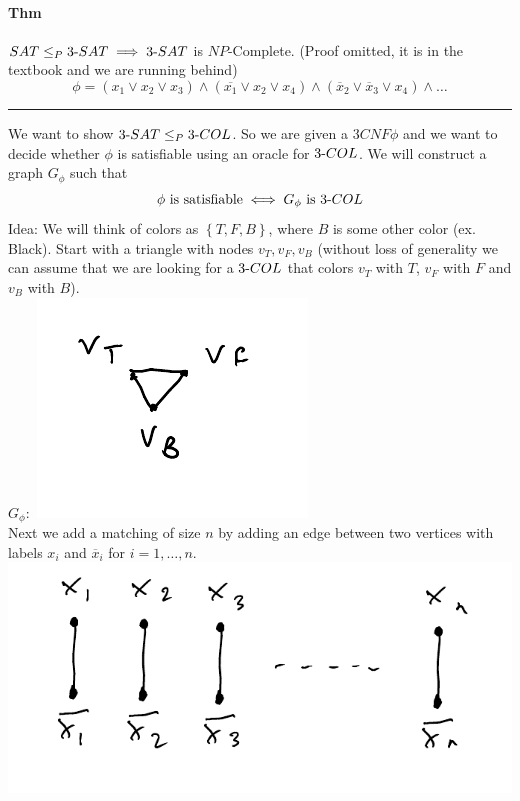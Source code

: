 \documentclass[12 pt]{article}
\begin{document}
          \paragraph{Thm} $SAT \leq_P 3\hbox{-}SAT \implies
          3\hbox{-}SAT$ is $NP$-Complete. (Proof omitted, it is in the
          textbook and we are running behind)
          $$\phi = (x_1 \lor x_2 \lor x_3) \land (\overline{x_1} \lor
          x_2 \lor x_4) \land (\overline{x}_2 \lor \overline{x}_3 \lor
          x_4) \land \ldots$$
          \noindent \rule{\textwidth}{0.5pt}
          We want to show $3\hbox{-}SAT \leq_P 3\hbox{-}COL$. So we
          are given a $3CNF \phi$ and we want to decide whether $\phi$
          is satisfiable using an oracle for $3\hbox{-}COL$. We will
          construct a graph $G_\phi$ such that $$\phi \text{ is satisfiable}
          \iff G_\phi \text{ is }3\hbox{-}COL$$
          Idea: We will think of colors as $\left\{T,F,B\right\}$,
          where $B$ is some other color (ex. Black). Start with a
          triangle with nodes $v_T, v_F, v_B$ (without loss of
          generality we can assume that we are looking for a
          $3\hbox{-}COL$ that colors $v_T$ with $T$, $v_F$ with $F$
          and $v_B$ with $B$).
          \\ $G_\phi:$ \includegraphics[width=.4\textwidth]{i134.pdf}
          \\ Next we add a matching of size $n$ by adding an edge
          between two vertices with labels $x_i$ and $\overline{x}_i$
          for $i=1,\ldots,n$.
          \\ \includegraphics[width=.9\textwidth]{i126.pdf}
\end{document}
